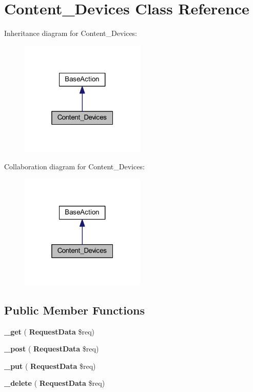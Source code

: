 \section{Content\+\_\+\+Devices Class Reference}
\label{class_lora_1_1_content_1_1_content___devices}


Inheritance diagram for Content\+\_\+\+Devices\+:\nopagebreak
\begin{figure}[H]
\begin{center}
\leavevmode
\includegraphics[width=169pt]{class_lora_1_1_content_1_1_content___devices__inherit__graph}
\end{center}
\end{figure}


Collaboration diagram for Content\+\_\+\+Devices\+:\nopagebreak
\begin{figure}[H]
\begin{center}
\leavevmode
\includegraphics[width=169pt]{class_lora_1_1_content_1_1_content___devices__coll__graph}
\end{center}
\end{figure}
\subsection*{Public Member Functions}
\begin{DoxyCompactItemize}
\item 
\mbox{\label{class_lora_1_1_content_1_1_content___devices_a3ad4bf1b146a3180b34d1327ff2abf69}} 
{\bfseries \+\_\+get} (\textbf{ Request\+Data} \$req)
\item 
\mbox{\label{class_lora_1_1_content_1_1_content___devices_a50751d47a139282d1c3b08cab1b6562e}} 
{\bfseries \+\_\+post} (\textbf{ Request\+Data} \$req)
\item 
\mbox{\label{class_lora_1_1_content_1_1_content___devices_a2affcc8f31c13147c33450193b229194}} 
{\bfseries \+\_\+put} (\textbf{ Request\+Data} \$req)
\item 
\mbox{\label{class_lora_1_1_content_1_1_content___devices_ab8ddc6de1e04524212f7d55893f78864}} 
{\bfseries \+\_\+delete} (\textbf{ Request\+Data} \$req)
\end{DoxyCompactItemize}
